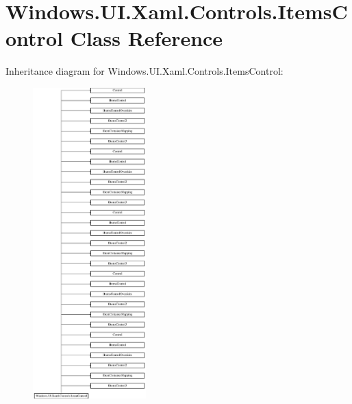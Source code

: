 \hypertarget{class_windows_1_1_u_i_1_1_xaml_1_1_controls_1_1_items_control}{}\section{Windows.\+U\+I.\+Xaml.\+Controls.\+Items\+Control Class Reference}
\label{class_windows_1_1_u_i_1_1_xaml_1_1_controls_1_1_items_control}
Inheritance diagram for Windows.\+U\+I.\+Xaml.\+Controls.\+Items\+Control\+:\begin{figure}[H]
\begin{center}
\leavevmode
\includegraphics[height=12.000000cm]{class_windows_1_1_u_i_1_1_xaml_1_1_controls_1_1_items_control}
\end{center}
\end{figure}
